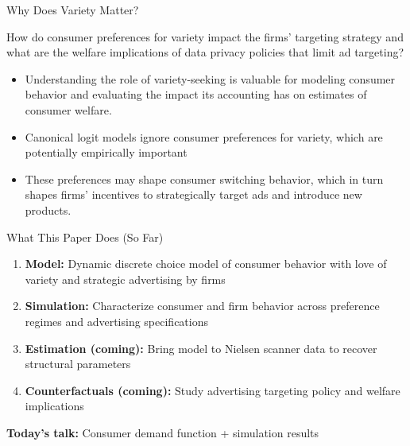 \documentclass[aspectratio=169,professionalfonts]{beamer}
\newcommand{\hl}[1]{\textbf{\textcolor{UGARed}{#1}}}
\begin{document}
\begin{frame}{Why Does Variety Matter?}
  \begin{tcolorbox}[colback=red!5!white, colframe=UGARed, title=\textbf{Research Question}]
    How do consumer preferences for variety impact the firms' targeting strategy and what are the welfare implications of data privacy policies that limit ad targeting?
  \end{tcolorbox}
  \begin{itemize}
    \item Understanding the role of variety-seeking is valuable for modeling consumer behavior and evaluating the impact its accounting has on estimates of consumer welfare.
    \item Canonical logit models ignore consumer preferences for variety, which are potentially empirically important 
    \item These preferences may shape consumer switching behavior, which in turn shapes firms' incentives to strategically target ads and introduce new products.
  \end{itemize}
\end{frame}

\begin{frame}{What This Paper Does (So Far)}
  \begin{enumerate}
    \item \hl{Model:} Dynamic discrete choice model of consumer behavior with love of variety and strategic advertising by firms
    \vspace{4pt}
    \item \hl{Simulation:} Characterize consumer and firm behavior
          across preference regimes and advertising
          specifications
    \vspace{4pt}
    \item \hl{Estimation (coming):} Bring model to Nielsen scanner data
          to recover structural parameters
    \vspace{4pt}
    \item \hl{Counterfactuals (coming):} Study advertising targeting policy and
          welfare implications
  \end{enumerate}
  \vspace{6pt}
  \textbf{Today's talk:} Consumer demand function + simulation results
\end{frame}
\end{document}
